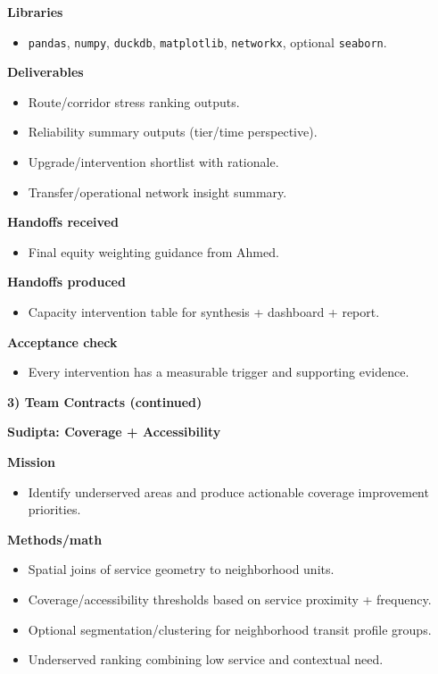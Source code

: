 \documentclass[10pt,letterpaper,twocolumn]{article}
\newcommand{\sectiontitle}[1]{\vspace{0.35em}\textbf{\large #1}\vspace{0.15em}}
\newcommand{\subhead}[1]{\textbf{#1}}
\begin{document}
\subhead{Libraries}
\begin{itemize}
  \item \texttt{pandas}, \texttt{numpy}, \texttt{duckdb}, \texttt{matplotlib}, \texttt{networkx}, optional \texttt{seaborn}.
\end{itemize}

\subhead{Deliverables}
\begin{itemize}
  \item Route/corridor stress ranking outputs.
  \item Reliability summary outputs (tier/time perspective).
  \item Upgrade/intervention shortlist with rationale.
  \item Transfer/operational network insight summary.
\end{itemize}

\subhead{Handoffs received}
\begin{itemize}
  \item Final equity weighting guidance from Ahmed.
\end{itemize}

\subhead{Handoffs produced}
\begin{itemize}
  \item Capacity intervention table for synthesis + dashboard + report.
\end{itemize}

\subhead{Acceptance check}
\begin{itemize}
  \item Every intervention has a measurable trigger and supporting evidence.
\end{itemize}

\sectiontitle{3) Team Contracts (continued)}

\subhead{Sudipta: Coverage + Accessibility}

\subhead{Mission}
\begin{itemize}
  \item Identify underserved areas and produce actionable coverage improvement priorities.
\end{itemize}

\subhead{Methods/math}
\begin{itemize}
  \item Spatial joins of service geometry to neighborhood units.
  \item Coverage/accessibility thresholds based on service proximity + frequency.
  \item Optional segmentation/clustering for neighborhood transit profile groups.
  \item Underserved ranking combining low service and contextual need.
\end{itemize}
\end{document}
